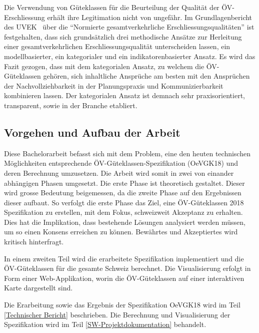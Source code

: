 Die Verwendung von Güteklassen für die Beurteilung der Qualität der \acs{ÖV}-Erschliessung erhält ihre Legitimation nicht von ungefähr.
Im Grundlagenbericht des \acs{UVEK}~\cite{grundlagenbericht_uvek} über die "`Normierte gesamtverkehrliche Erschliessungsqualitäten"' ist festgehalten, dass sich grundsätzlich drei methodische Ansätze zur Herleitung einer gesamtverkehrlichen Erschliessungsqualität unterscheiden lassen, ein modellbasierter, ein kategorialer und ein indikatorenbasierter Ansatz.
Es wird das Fazit gezogen, dass mit dem kategorialen Ansatz, zu welchem die \acs{ÖV}-Güteklassen gehören, sich inhaltliche Ansprüche am besten mit den Ansprüchen der Nachvollziehbarkeit in der Planungspraxis und Kommunizierbarkeit kombinieren lassen.
Der kategorialen Ansatz ist demnach sehr praxisorientiert, transparent, sowie in der Branche etabliert.

\subsection{Vorgehen und Aufbau der Arbeit}
\label{Einführung:Vorgehen und Aufbau der Arbeit}

Diese Bachelorarbeit befasst sich mit dem Problem, eine den heuten technischen Möglichkeiten entsprechende \acs{ÖV}-Güteklassen-Spezifikation (\gls{OeVGK18}) und deren Berechnung umzusetzen.
Die Arbeit wird somit in zwei von einander abhängigen Phasen umgesetzt.
Die erste Phase ist theoretisch gestaltet.
Dieser wird grosse Bedeutung beigemessen, da die zweite Phase auf den Ergebnissen dieser aufbaut.
So verfolgt die erste Phase das Ziel, eine \acs{ÖV}-Güteklassen 2018 Spezifikation zu erstellen, mit dem Fokus, schweizweit Akzeptanz zu erhalten.
Dies hat die Implikation, dass bestehende Lösungen analysiert werden müssen, um so einen Konsens erreichen zu können.
Bewährtes und Akzeptiertes wird kritisch hinterfragt.

In einem zweiten Teil wird die erarbeitete Spezifikation implementiert und die \acs{ÖV}-Güteklassen für die gesamte Schweiz berechnet.
Die Visualisierung erfolgt in Form einer Web-Applikation, worin die \acs{ÖV}-Güteklassen auf einer interaktiven Karte dargestellt sind.

Die Erarbeitung sowie das Ergebnis der Spezifikation \gls{OeVGK18} wird im Teil \ref{Technischer Bericht} beschrieben.
Die Berechnung und Visualisierung der Spezifikation wird im Teil \ref{SW-Projektdokumentation} behandelt.
